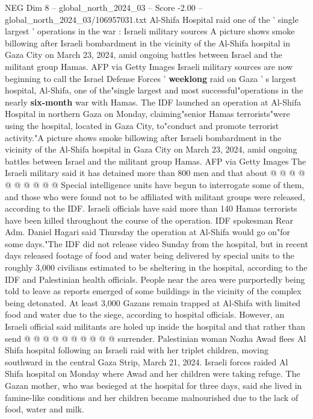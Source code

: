 \begin{textsample}{NEG Dim 8 – global\_north\_2024\_03 – Score -2.00 – global\_north\_2024\_03/106957031.txt}  \label{ex:f8_neg_220}
Al-Shifa Hospital raid one of the ' single largest ' operations in the war : Israeli military sources A picture shows smoke billowing after Israeli bombardment in the vicinity of the Al-Shifa hospital in Gaza City on March 23, 2024, amid ongoing battles between Israel and the militant group Hamas.
AFP via Getty Images Israeli military sources are now beginning to call the Israel Defense Forces ' \textbf{weeklong} raid on Gaza ' s largest hospital, Al-Shifa, one of the"single largest and most successful"operations in the nearly \textbf{six-month} war with Hamas.
The IDF launched an operation at Al-Shifa Hospital in northern Gaza on Monday, claiming"senior Hamas terrorists"were using the hospital, located in Gaza City, to"conduct and promote terrorist activity."A picture shows smoke billowing after Israeli bombardment in the vicinity of the Al-Shifa hospital in Gaza City on March 23, 2024, amid ongoing battles between Israel and the militant group Hamas.
AFP via Getty Images The Israeli military said it has detained more than 800 men and that about @ @ @ @ @ @ @ @ @ @ Special intelligence units have begun to interrogate some of them, and those who were found not to be affiliated with militant groups were released, according to the IDF.
Israeli officials have said more than 140 Hamas terrorists have been killed throughout the course of the operation.
IDF spokesman Rear Adm.
Daniel Hagari said Thursday the operation at Al-Shifa would go on"for some days."The IDF did not release video Sunday from the hospital, but in recent days released footage of food and water being delivered by special units to the roughly 3,000 civilians estimated to be sheltering in the hospital, according to the IDF and Palestinian health officials.
People near the area were purportedly being told to leave as reports emerged of some buildings in the vicinity of the complex being detonated.
At least 3,000 Gazans remain trapped at Al-Shifa with limited food and water due to the siege, according to hospital officials.
However, an Israeli official said militants are holed up inside the hospital and that rather than send @ @ @ @ @ @ @ @ @ @ surrender.
Palestinian woman Nozha Awad flees Al Shifa hospital following an Israeli raid with her triplet children, moving southward in the central Gaza Strip, March 21, 2024.
Israeli forces raided Al Shifa hospital on Monday where Awad and her children were taking refuge.
The Gazan mother, who was besieged at the hospital for three days, said she lived in famine-like conditions and her children became malnourished due to the lack of food, water and milk.

\end{textsample}
